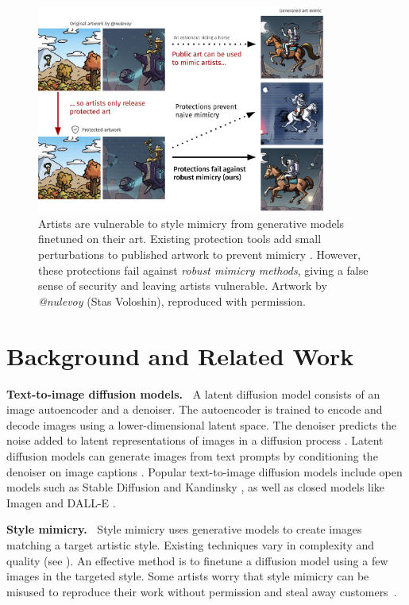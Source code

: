 \documentclass{article}
\begin{document}
\begin{figure}[t]
    \centering
    \includegraphics[width=0.85\textwidth]{plots/Figure_1.pdf}
    \caption{Artists are vulnerable to style mimicry from  generative models finetuned on their art. Existing protection tools add small perturbations to published artwork to prevent mimicry \citep{glaze,mist,antidreambooth}. However, these protections fail against \emph{robust mimicry methods}, giving a false sense of security and leaving artists vulnerable.  Artwork by \emph{@nulevoy} (Stas Voloshin), reproduced with permission.}
    \label{fig:figure1}
\end{figure}





\section{Background and Related Work}

\textbf{Text-to-image diffusion models.~} A latent diffusion model consists
of an image autoencoder and a denoiser. The autoencoder is trained to encode and decode images using a lower-dimensional latent space. The denoiser predicts the noise added to latent representations of images
in a diffusion process \citep{diffusion}.
Latent diffusion models can generate images from text prompts by conditioning the denoiser on image captions \citep{stablediffusion}. Popular text-to-image diffusion models include open models such as Stable Diffusion \citep{stablediffusion} and Kandinsky \citep{kandinsky}, as well as closed models like Imagen \citep{imagen} and DALL-E \citep{dalle2, dalle3}.

\textbf{Style mimicry.~} Style mimicry uses generative models to create images matching a target artistic style.
Existing techniques vary in complexity and quality (see ). An effective method is to finetune a diffusion model using a few images in the targeted style. Some artists worry that style mimicry can be misused to reproduce their work without permission and steal away customers~\citep{techreview}.
\end{document}
